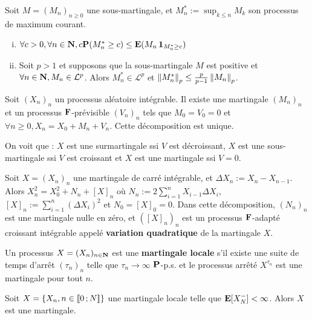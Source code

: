 	\begin{thm}
		Soit $M = (M_n)_{n \geq 0}$ une sous-martingale, et $M_n^* := \sup_{k \leq n} M_k$ son processus de maximum courant.
		\begin{enumerate}[(i)]
			\item $\forall c > 0, \forall n \in \mathbf{N}, c \mathbf{P}(M_n^* \geq c) \leq \mathbf{E}(M_n \operatorname{\mathbf{1}}_{M_n^* \geq c})$
			\item Soit $p > 1$ et supposons que la sous-martingale $M$ est positive et $\forall n \in \mathbf{N}, M_n \in \mathcal{L}^p$.
				Alors $M_n^* \in \mathcal{L}^p$ et $\left\lVert M_n^*\right\rVert_p \leq \frac{p}{p - 1} \left\lVert M_n\right\rVert_p$.
		\end{enumerate}
	\end{thm}

	\begin{pop}
		Soit $(X_n)_n$ un processus aléatoire intégrable.
		Il existe une martingale $(M_n)_n$ et un processus $\mathbf{F}$-prévisible $(V_n)_n$ tels que $M_0 = V_0 = 0$ et $\forall n \geq 0, X_n = X_0 + M_n + V_n$.
		Cette décomposition est unique.
	\end{pop}

	\begin{rem}
		On voit que : $X$ est une surmartingale ssi $V$ est décroissant, $X$ est une sous-martingale ssi $V$ est croissant et $X$ est une martingale ssi $V = 0$.
	\end{rem}

	\begin{pop}
		Soit $X = (X_n)_n$ une martingale de carré intégrable, et $\Delta X_n := X_n - X_{n - 1}$.
		Alors $X_n^2 = X_0^2 + N_n + [X]_n$ où $N_n := 2 \sum_{i = 1}^n  X_{i - 1} \Delta X_i$, $[X]_n := \sum_{i = 1}^n (\Delta X_i)^2$ et $N_0 = [X]_0 = 0$.
		Dans cette décomposition, $(N_n)_n$ est une martingale nulle en zéro, et $([X]_n)_n$ est un processus $\mathbf{F}$-adapté croissant intégrable appelé \textbf{variation quadratique} de la martingale $X$.
	\end{pop}

	\begin{defn}
		Un processus $X = (X_n)_{n \in \mathbf{N}}$ est une \textbf{martingale locale} s'il existe une suite de temps d'arrêt $(\tau_n)_n$ telle que $\tau_n \longrightarrow \infty$ $\mathbf{P}$-p.s. et le processus arrêté $X^{\tau_n}$ est une martingale pour tout $n$.
	\end{defn}

	\begin{lem}
		Soit $X = \{ X_n, n \in \mathopen{}\mathclose{\left[\![0\mathclose{}\mathpunct{};N\right]\!]} \}$ une martingale locale telle que $\mathbf{E}[X_N^-] < \infty$.
		Alors $X$ est une martingale.
	\end{lem}
